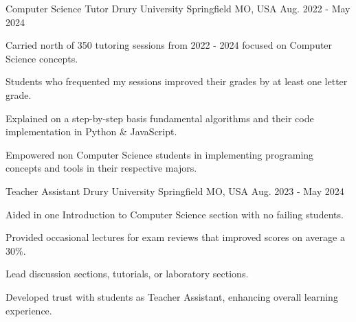 
\begin{cventries}

    \cventry
    {Computer Science Tutor} %
    {Drury University} %
    {Springfield MO, USA} %
    {Aug. 2022 - May 2024} %
    {
        \begin{cvitems}
        \item{Carried north of 350 tutoring sessions from 2022 - 2024 focused on Computer Science concepts.}
        \item{Students who frequented my sessions improved their grades by at least one letter grade.}
        \item{Explained on a step-by-step basis fundamental algorithms and their code implementation in Python \& JavaScript.}
        \item{Empowered non Computer Science students in implementing programing concepts and tools in their respective majors.}
        \end{cvitems}
        }


        \cventry
        {Teacher Assistant} %
        {Drury University} %
        {Springfield MO, USA} %
        {Aug. 2023 - May 2024} %
        {
            \begin{cvitems} %
            \item {Aided in one Introduction to Computer Science section with no failing students.}
            \item {Provided occasional lectures for exam reviews that improved scores on average a 30\%.}
            \item {Lead discussion sections, tutorials, or laboratory sections.}
            \item {Developed trust with students as Teacher Assistant, enhancing overall learning experience.}
            \end{cvitems}
        }

\end{cventries}
